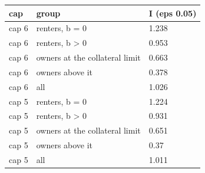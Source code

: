 \begingroup\small
\setlength{\tabcolsep}{3pt}
\renewcommand{\arraystretch}{1.04}
\begin{tabularx}{\linewidth}{XXX}
\toprule
cap & group & I (eps 0.05) \\
\midrule
cap 6 & renters, b = 0 & 1.238 \\
cap 6 & renters, b \textgreater{} 0 & 0.953 \\
cap 6 & owners at the collateral limit & 0.663 \\
cap 6 & owners above it & 0.378 \\
cap 6 & all & 1.026 \\
cap 5 & renters, b = 0 & 1.224 \\
cap 5 & renters, b \textgreater{} 0 & 0.931 \\
cap 5 & owners at the collateral limit & 0.651 \\
cap 5 & owners above it & 0.37 \\
cap 5 & all & 1.011 \\
\bottomrule
\end{tabularx}
\endgroup
